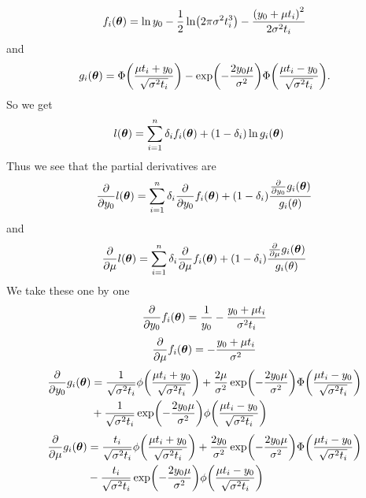 \begin{equation}
f_i(\btheta)=\ln y_0-\frac{1}{2}\ln\p*{2\pi\sigma^2\ti^3}-\frac{\p*{y_0+\mu\ti}^2}{2\sigma^2\ti}
\end{equation}
and
\begin{equation}
g_i(\btheta)=\Phi\p*{\frac{\mu\ti+y_0}{\sqrt{\sigma^2\ti}}}-\exp\p*{-\frac{2y_0\mu}{\sigma^2}}\Phi\p*{\frac{\mu\ti-y_0}{\sqrt{\sigma^2\ti}}}.
\end{equation}
So we get
\begin{align}
    l(\boldsymbol{\theta})&=\sum_{i=1}^n\delta_{i} f_i(\boldsymbol{\theta})+(1-\delta_{i})\ln{g_i(\boldsymbol{\theta})}
\end{align}
Thus we see that the partial derivatives are
\begin{equation}
    \frac{\partial}{\partial y_0}l(\boldsymbol{\theta})=\sum_{i=1}^n\delta_{i} \frac{\partial}{\partial y_0}f_i(\boldsymbol{\theta})+(1-\delta_{i})\frac{\frac{\partial}{\partial y_0}g_i(\boldsymbol{\theta})}{g_i(\theta)}
\end{equation}
and
\begin{equation}
    \frac{\partial}{\partial \mu}l(\boldsymbol{\theta})=\sum_{i=1}^n\delta_{i} \frac{\partial}{\partial \mu}f_i(\boldsymbol{\theta})+(1-\delta_{i})\frac{\frac{\partial}{\partial \mu}g_i(\boldsymbol{\theta})}{g_i(\theta)}
\end{equation}
We take these one by one
\begin{equation}
    \frac{\partial}{\partial y_0}f_i(\boldsymbol{\theta})=\frac{1}{y_0}-\frac{y_0+\mu t_{i}}{\sigma^2t_{i}}
\end{equation}
\begin{equation}
    \frac{\partial}{\partial \mu}f_i(\boldsymbol{\theta})=-\frac{y_0+\mu t_{i}}{\sigma^2}
\end{equation}
\begin{align}
\begin{split}
    \frac{\partial}{\partial y_0}g_i(\btheta)&=\frac{1}{\sqrt{\sigma^2\ti}}\phi\p*{\frac{\mu\ti+y_0}{\sqrt{\sigma^2\ti}}}+\frac{2\mu}{\sigma^2}\exp\p*{-\frac{2y_0\mu}{\sigma^2}}\Phi\p*{\frac{\mu\ti-y_0}{\sqrt{\sigma^2\ti}}} \\
    &+
    \frac{1}{\sqrt{\sigma^2\ti}}\exp\p*{-\frac{2y_0\mu}{\sigma^2}}\phi\p*{\frac{\mu\ti-y_0}{\sqrt{\sigma^2\ti}}}
\end{split}
\end{align}
\begin{align}
\begin{split}
    \frac{\partial}{\partial \mu}g_i(\btheta)&=\frac{\ti}{\sqrt{\sigma^2\ti}}\phi\p*{\frac{\mu\ti+y_0}{\sqrt{\sigma^2\ti}}}+\frac{2y_0}{\sigma^2}\exp\p*{-\frac{2y_0\mu}{\sigma^2}}\Phi\p*{\frac{\mu\ti-y_0}{\sqrt{\sigma^2\ti}}} \\
    &-
    \frac{\ti}{\sqrt{\sigma^2\ti}}\exp\p*{-\frac{2y_0\mu}{\sigma^2}}\phi\p*{\frac{\mu\ti-y_0}{\sqrt{\sigma^2\ti}}}
\end{split}
\end{align}
